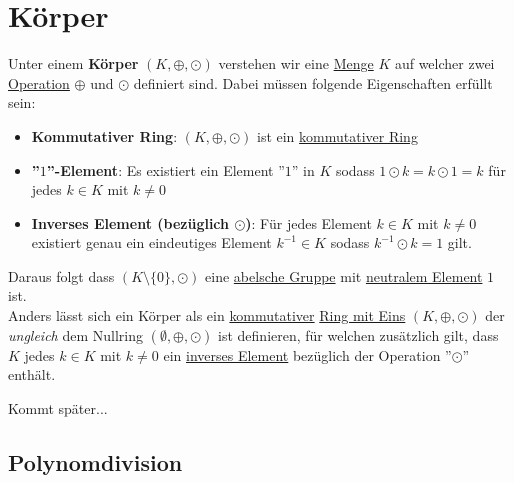 \documentclass[../../main.tex]{subfiles}
\begin{document}
		\section{Körper}
		\begin{definition}[Körper]
			\label{def:Körper}
			Unter einem \textbf{Körper} $(K, \oplus, \odot)$ verstehen wir eine \hyperref[def:Menge]{Menge} $K$ auf welcher zwei \hyperref[def:Operation]{Operation} $\oplus$ und $\odot$ definiert sind. Dabei müssen folgende Eigenschaften erfüllt sein: 
			\begin{itemize}
				\item \textbf{Kommutativer Ring}: $(K, \oplus, \odot)$ ist ein \hyperref[def:kommutativerRing]{kommutativer Ring}
				\item \textbf{''$1$''-Element}: Es existiert ein Element ''$1$'' in $K$ sodass $1 \odot k = k \odot 1 = k$ für jedes $k \in K$ mit $k\not=0$ 
				\item \textbf{Inverses Element (bezüglich $\odot$)}: Für jedes Element $k\in K$ mit $k\not = 0$ existiert genau ein eindeutiges Element $k^{-1} \in K$ sodass $k^{-1} \odot k = 1$ gilt.
			\end{itemize}
			Daraus folgt dass $(K\setminus \{0\}, \odot)$ eine \hyperref[def:abelscheGruppe]{abelsche Gruppe} mit \hyperref[def:neutralesElement]{neutralem Element} $1$ ist. \\
			
			Anders lässt sich ein Körper als ein \hyperref[def:kommutativerRing]{kommutativer} \hyperref[def:RingMitEins]{Ring mit Eins} $(K,\oplus,\odot)$ der \textit{ungleich} dem Nullring $(\emptyset, \oplus, \odot)$ ist definieren, für welchen zusätzlich gilt, dass $K$ jedes $k \in K$ mit $k \not = 0$ ein \hyperref[def:inversesElement]{inverses Element} bezüglich der Operation ''$\odot$'' enthält.
		\end{definition}
	
		\begin{definition}
			\label{def:endlicherKörper}
			\label{def:Galoiskörper}
			Kommt später...
		\end{definition}
	
		\subsection{Polynomdivision}
		
\end{document}
